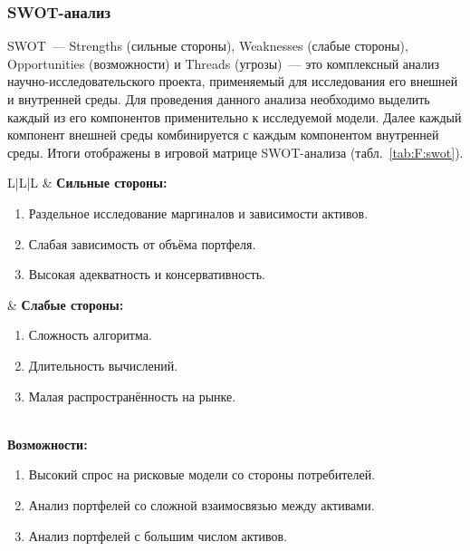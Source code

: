 \subsubsection{SWOT-анализ}

SWOT~--- Strengths (сильные стороны), Weaknesses (слабые стороны), Opportunities (возможности) и Threads (угрозы)~--- это комплексный анализ научно-исследовательского проекта, применяемый для исследования его внешней и внутренней среды.
Для проведения данного анализа необходимо выделить каждый из его компонентов применительно к исследуемой модели. 
Далее каждый компонент внешней среды комбинируется с каждым компонентом внутренней среды. 
Итоги отображены в игровой матрице SWOT-анализа (табл.~\ref{tab:F:swot}).

\begin{table}[tbh!]
\caption{SWOT-анализ}
\label{tab:F:swot}
\centering
\small
\renewcommand\tabularxcolumn[1]{p{#1}}
\begin{tabularx}{\textwidth}
{L|L|L} \toprule
    & \textbf{Сильные стороны:}
    \begin{enumerate}[wide=0pt,labelsep=4pt,after=\vspace{-\baselineskip}]
        \item Раздельное исследование маргиналов и зависимости активов.
        \item Слабая зависимость от объёма портфеля.
        \item Высокая адекватность и консервативность.
    \end{enumerate} & \textbf{Слабые стороны:}
    \begin{enumerate}[wide=0pt,labelsep=4pt,after=\vspace{-\baselineskip}]
        \item Сложность алгоритма.
        \item Длительность вычислений.
        \item Малая распространённость на рынке.
    \end{enumerate} \\
    \midrule
    \textbf{Возможности:}
    \begin{enumerate}[wide=0pt,labelsep=4pt,after=\vspace{-\baselineskip}]
        \item Высокий спрос на рисковые модели со стороны потребителей.
        \item Анализ портфелей со сложной взаимосвязью между активами.
        \item Анализ портфелей с большим числом активов.

\end{enumerate}
\end{tabularx}
\end{table}

